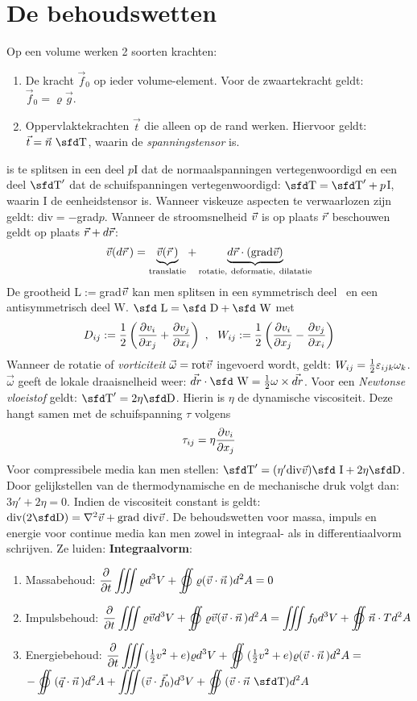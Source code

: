 \section{De behoudswetten}
Op een volume werken 2 soorten krachten:
\begin{enumerate}
\item  De kracht  $\vec{f}_0$ op ieder volume-element. Voor de zwaartekracht
       geldt: $\vec{f}_0=\varrho\vec{g}$.
\item Oppervlaktekrachten $\vec{t}$ die alleen op de rand werken. Hiervoor
      geldt: $\vec{t}=\vec{n}~\TT$, waarin {\TT} de {\it spanningstensor} is.
\end{enumerate}
{\TT} is te splitsen in een deel $p${\sfd I} dat de normaalspanningen
vertegenwoordigd en een deel $\TT'$ dat de schuifspanningen vertegenwoordigd:
$\TT=\TT'+p${\sfd I}, waarin {\sfd I} de eenheidstensor is. Wanneer viskeuze
aspecten te verwaarlozen zijn geldt: div\TT$=-$grad$p$.
\npar
Wanneer de stroomsnelheid $\vec{v}$ is op plaats $\vec{r}$ beschouwen geldt op plaats
$\vec{r}+d\vec{r}$:
\[
\vec{v}(d\vec{r}\,)=
\underbrace{\vec{v}(\vec{r}\,)}_{\rm translatie}+
\underbrace{d\vec{r}\cdot({\rm grad}\vec{v})}_{\rm rotatie,~deformatie,~dilatatie}
\]
De grootheid {\sfd L}$:=$grad$\vec{v}$ kan men splitsen in een symmetrisch deel
\DD~en een antisymmetrisch deel {\sfd W}.
$\mbox{\sfd L}=\mbox{\sfd D}+\mbox{\sfd W}$ met
\[
D_{ij}:=\frac{1}{2}\left(\frac{\partial v_i}{\partial x_j}+\frac{\partial v_j}{\partial x_i}\right)~,~~
W_{ij}:=\frac{1}{2}\left(\frac{\partial v_i}{\partial x_j}-\frac{\partial v_j}{\partial x_i}\right)
\]
Wanneer de rotatie of {\it vorticiteit} $\vec{\omega}={\rm rot}\vec{v}$ ingevoerd
wordt, geldt: $W_{ij}=\mbox{$\frac{1}{2}$}\varepsilon_{ijk}\omega_k$. $\vec{\omega}$ geeft
de lokale draaisnelheid weer: $\vec{dr}\cdot\mbox{\sfd W}=\half\omega\times\vec{dr}$.
\npar
Voor een {\it Newtonse vloeistof} geldt: $\TT'=2\eta\DD$. Hierin is $\eta$ de
dynamische viscositeit. Deze hangt samen met de schuifspanning $\tau$ volgens
\[
\tau_{ij}=\eta\frac{\partial v_i}{\partial x_j}
\]
Voor compressibele media kan men stellen:
$\TT'=(\eta'{\rm div}\vv)\mbox{\sfd I}+2\eta\DD$. Door gelijkstellen van de
thermodynamische en de mechanische druk volgt dan: $3\eta'+2\eta=0$. Indien
de viscositeit constant is geldt: ${\rm div}(2\DD)=\nabla^2\vv+{\rm grad~div}\vv$.
\npar
De behoudswetten voor massa, impuls en energie voor continue media kan men
zowel in integraal- als in differentiaalvorm schrijven. Ze luiden:
\npar
{\large\bf Integraalvorm}:
\begin{enumerate}
\item Massabehoud: $\displaystyle\Q{}{t}\iiint\varrho d^3V+\oiint\varrho(\vv\cdot\vvec{n})d^2A=0$
\item Impulsbehoud: $\displaystyle\Q{}{t}\iiint\varrho\vv d^3V+\oiint\varrho\vv(\vv\cdot\vvec{n})d^2A=\iiint f_0d^3V+\oiint\vec{n}\cdot Td^2A$
\item Energiebehoud: $\displaystyle\Q{}{t}\iiint(\half v^2+e)\varrho d^3V+\oiint(\half v^2+e)\varrho(\vv\cdot\vvec{n})d^2A=$\\[3mm]
\hspace*{35mm}$\displaystyle-\oiint(\vec{q}\cdot\vvec{n})d^2A+\iiint(\vv\cdot\vec{f}_0)d^3V+\oiint(\vv\cdot\vec{n}~\TT)d^2A$
\end{enumerate}

